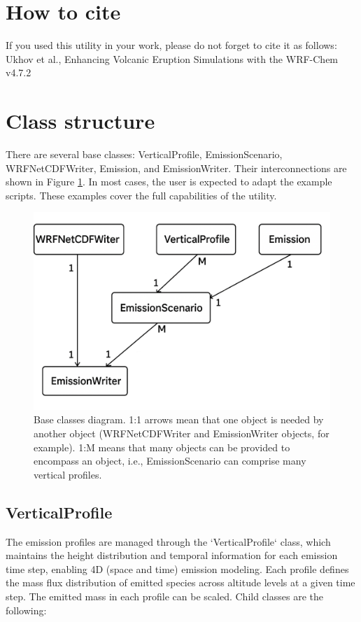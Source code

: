\documentclass{article}
\begin{document}
\section{How to cite}
If you used this utility in your work, please do not forget to cite it as follows: 
Ukhov et al., Enhancing Volcanic Eruption Simulations with the WRF-Chem v4.7.2

\clearpage
\section{Class structure}
There are several base classes: VerticalProfile, EmissionScenario, WRFNetCDFWriter, Emission, and EmissionWriter. Their interconnections are shown in Figure \ref{fig1}. In most cases, the user is expected to adapt the example scripts. These examples cover the full capabilities of the utility.

\begin{figure}
    \centering
    \includegraphics[width=0.7\linewidth]{./fig1_diagram.png}
    \caption{Base classes diagram. 1:1 arrows mean that one object is needed by another object (WRFNetCDFWriter and EmissionWriter objects, for example). 1:M means that many objects can be provided to encompass an object, i.e., EmissionScenario can comprise many vertical profiles.}
    \label{fig1}
\end{figure}

\subsection{VerticalProfile}
The emission profiles are managed through the `VerticalProfile` class, which maintains the height distribution and temporal information for each emission time step, enabling 4D (space and time) emission modeling. Each profile defines the mass flux distribution of emitted species across altitude levels at a given time step. The emitted mass in each profile can be scaled. Child classes are the following:
\end{document}
